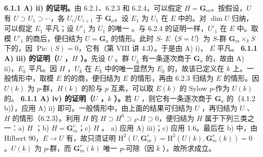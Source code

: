 \textbf{6.1.1 A) ii) 的证明。}由 6.2.1、6.2.3 和 6.2.4，可以假定 $H=\mathbf G_m$。按假设，$U$ 有 $U\supset U_1\supset\cdots$，各 $U_i/U_{i+1}$ 于 $\mathbf G_a$。设 $E_1$ 为 $U_1$ 在 $E$ 中的。对 $\dim U$ 归纳，可以假定 $E_1$ 平凡；设 $U'_1$ 为 $U_1$ 的唯一
。与 6.2.4 的证明一样，$U'_1$ 在 $E$ 中。取模 $U'_1$ 的商后，便归结为 $U=\mathbf G_a$ 的情形。此时 $S$- $E$（$S=U$）为 $S$-群 $\mathbf G_m\times_kS$ 下的，因 $\operatorname{Pic}(S)=0$，它有（第 VIII 讲 4.3）。于是由 A) i)， $E$ 平凡。
\textbf{6.1.1 A) iii) 的证明（$U$ ，$H$ ）。}先设 $U$ 。群 $U_{\bar k}$ 有一条逐次商于 $\mathbf G_a$ 的，故由 A) ii)，$E_{\bar k}$ 平凡。因 $H$ ，$U_{\bar k}$ 在 $E_{\bar k}$ 中的唯一显然为 $E_{\bar k}$ 的，故该已定义在 $k$ 上。一般情形中，取模 $E$ 的的商，便归结为 $E$ 的情形，再由 6.2.3 归结为 $E$ 的情形。因 $U(k)$ 为 $p$-群，$H(k)$ 的阶与 $p$ 互素，可以取 $E(k)$ 的 Sylow $p$-作为 $U(k)$ 的。
\textbf{6.1.1 A) iv) 的证明（$U$ ，$k$ ）。}若 $U$ ，则它有一条逐次商于 $\mathbf G_a$ 的（4.1.2 b)），应用 A) ii) 即可。一般情形中，由上面的结果可归结为 $U$ ，再归结为 $U$ 、$H$ 的情形（6.2.3）。利用 $H$ 的 $H\supset H^0\supset{}_{F^n}H\supset0$，便归结为 $H$ 属于下列三类之一：a) $H$ ；b) $H=\mathbf G_m^r$；c) $H$ 。
a) 应用 A) iii)；c) 应用 1.6。最后在 b) 中，由 Hilbert  90，$E\to U$ 有，故只须证明 $\mathrm H^2(U,\mathbf G_m^r)=\mathrm H^2(U(k),\mathbf G_m^r(k))=0$。$U(k)$ 为 $p$-群，而 $\mathbf G_m^r(k)$ 唯一 $p$-可除（因 $k$ ），故所求成立。

